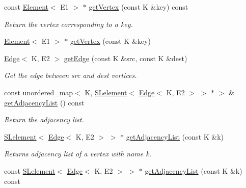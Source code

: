 \begin{DoxyCompactItemize}
const \hyperlink{classbridges_1_1datastructure_1_1_element}{Element}$<$ E1 $>$ $\ast$ \hyperlink{classbridges_1_1datastructure_1_1_graph_adj_list_ada58af550495cee2fe454c0be0f8504e}{get\+Vertex} (const K \&key) const
\begin{DoxyCompactList}\small\item\em Return the vertex corresponding to a key. \end{DoxyCompactList}\item 
\hyperlink{classbridges_1_1datastructure_1_1_element}{Element}$<$ E1 $>$ $\ast$ \hyperlink{classbridges_1_1datastructure_1_1_graph_adj_list_aa55482a035e233299d49874732113e6d}{get\+Vertex} (const K \&key)
\item 
\hyperlink{classbridges_1_1datastructure_1_1_edge}{Edge}$<$ K, E2 $>$ \hyperlink{classbridges_1_1datastructure_1_1_graph_adj_list_a2d8ff5a971516d05ff07bb1c3b73e405}{get\+Edge} (const K \&src, const K \&dest)
\begin{DoxyCompactList}\small\item\em Get the edge between src and dest vertices. \end{DoxyCompactList}\item 
const unordered\+\_\+map$<$ K, \hyperlink{classbridges_1_1datastructure_1_1_s_lelement}{S\+Lelement}$<$ \hyperlink{classbridges_1_1datastructure_1_1_edge}{Edge}$<$ K, E2 $>$ $>$ $\ast$ $>$ \& \hyperlink{classbridges_1_1datastructure_1_1_graph_adj_list_a23dad50371f073dd9a2f48e83720e86c}{get\+Adjacency\+List} () const
\begin{DoxyCompactList}\small\item\em Return the adjacency list. \end{DoxyCompactList}\item 
\hyperlink{classbridges_1_1datastructure_1_1_s_lelement}{S\+Lelement}$<$ \hyperlink{classbridges_1_1datastructure_1_1_edge}{Edge}$<$ K, E2 $>$ $>$ $\ast$ \hyperlink{classbridges_1_1datastructure_1_1_graph_adj_list_aa3df7d161ed7847a188b5818f78818d8}{get\+Adjacency\+List} (const K \&k)
\begin{DoxyCompactList}\small\item\em Returns adjacency list of a vertex with name k. \end{DoxyCompactList}\item 
const \hyperlink{classbridges_1_1datastructure_1_1_s_lelement}{S\+Lelement}$<$ \hyperlink{classbridges_1_1datastructure_1_1_edge}{Edge}$<$ K, E2 $>$ $>$ $\ast$ \hyperlink{classbridges_1_1datastructure_1_1_graph_adj_list_a1f8ea98a84017aa4bf6058475c0b3ed0}{get\+Adjacency\+List} (const K \&k) const

\end{DoxyCompactItemize}
